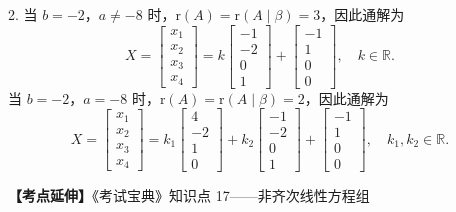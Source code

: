 \documentclass[a4paper,11pt]{ctexart}
\newcommand{\rk}{\mathrm{r}}
\begin{document}
2. 当 $b = -2$，$a \neq -8$ 时，$\rk(A) = \rk(A \mid \beta) = 3$，因此通解为
\[
  X = \begin{bmatrix} x_1 \\ x_2 \\ x_3 \\ x_4 \end{bmatrix}
  = k \begin{bmatrix} -1 \\ -2 \\ 0 \\ 1 \end{bmatrix} + \begin{bmatrix} -1 \\ 1 \\ 0 \\ 0 \end{bmatrix},\quad k \in \mathbb{R}.
\]
当 $b = -2$，$a = -8$ 时，$\rk(A) = \rk(A \mid \beta) = 2$，因此通解为
\[
  X = \begin{bmatrix} x_1 \\ x_2 \\ x_3 \\ x_4 \end{bmatrix}
  = k_1 \begin{bmatrix} 4 \\ -2 \\ 1 \\ 0 \end{bmatrix} + k_2 \begin{bmatrix} -1 \\ -2 \\ 0 \\ 1 \end{bmatrix} + \begin{bmatrix} -1 \\ 1 \\ 0 \\ 0 \end{bmatrix},\quad k_1, k_2 \in \mathbb{R}.
\]

\textbf{【考点延伸】}《考试宝典》知识点 17——非齐次线性方程组

\vspace{0.8em}
\end{document}
